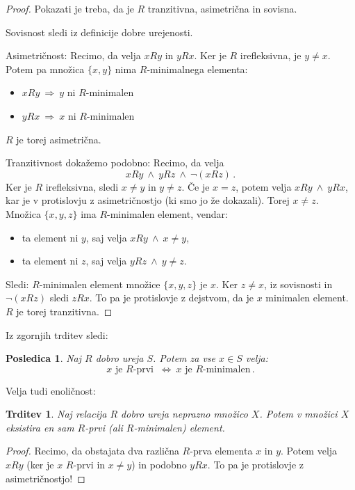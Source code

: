 \documentclass[11pt,paper=b5,footinclude,headinclude]{scrbook} %
\def\inn {{~\wedge~}}
\def\sledi {{~\Rightarrow~}}
\def\cee {{~\Leftrightarrow~}}
\newtheorem*{trditev}{Trditev}
\newtheorem*{posledica}{Posledica}
\begin{document}
\begin{proof}
Pokazati je treba, da je $R$ tranzitivna, asimetrična in sovisna.

Sovisnost sledi iz definicije dobre urejenosti.

Asimetričnost: Recimo, da velja $xRy$ in $yRx$. Ker je $R$ irefleksivna, je $y\neq x$.
Potem pa množica $\{x,y\}$ nima $R$-minimalnega elementa:
\begin{itemize}
  \item $xRy\sledi y$ ni $R$-minimalen
  \item $yRx\sledi x$ ni $R$-minimalen
\end{itemize}
$R$ je torej asimetrična.

Tranzitivnost dokažemo podobno: Recimo, da velja
$$xRy\inn yRz\inn \neg(xRz)\,.$$
Ker je $R$ irefleksivna, sledi $x\neq y$ in $y\neq z$.
Če je $x = z$, potem velja $xRy\inn yRx$, kar je v protislovju z asimetričnostjo (ki smo jo že dokazali).
Torej $x\neq z$.
Množica $\{x,y,z\}$ ima $R$-minimalen element, vendar:
\begin{itemize}
  \item ta element ni $y$, saj velja $xRy \inn x\neq y$,
  \item ta element ni $z$, saj velja $yRz \inn y\neq z$.
\end{itemize}
Sledi: $R$-minimalen element množice $\{x,y,z\}$ je $x$.
Ker $z\neq x$, iz sovisnosti in $\neg(xRz)$ sledi $zRx$.
To pa je protislovje z dejstvom, da je $x$ minimalen element.
$R$ je torej tranzitivna.
\end{proof}

Iz zgornjih trditev sledi:

\begin{posledica}
Naj $R$ dobro ureja $S$. Potem za vse $x\in S$ velja:
$$x \textrm{ je } R\textrm{-prvi } \cee x \textrm{ je } R\textrm{-minimalen}\,.$$
\end{posledica}

Velja tudi enoličnost:

\begin{trditev}
Naj relacija $R$ dobro ureja neprazno množico $X$. Potem v množici $X$ eksistira {\em en sam} $R$-prvi (ali $R$-minimalen) element.
\end{trditev}

\begin{proof}
Recimo, da obstajata dva različna $R$-prva elementa $x$ in $y$.
Potem velja $xRy$ (ker je $x$ $R$-prvi in $x\neq y$) in podobno $yRx$.
To pa je protislovje z asimetričnostjo!
\end{proof}
\end{document}
